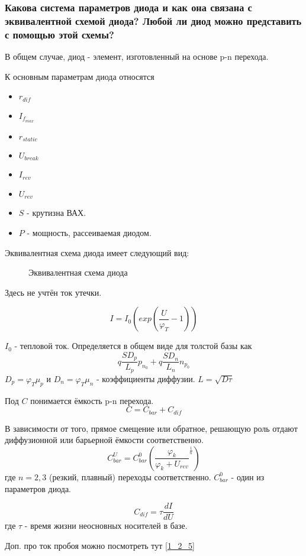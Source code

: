 \subsubsection{Какова система параметров диода и как она связана с эквивалентной схемой диода? Любой ли диод можно представить с помощью этой схемы?}

В общем случае, диод - элемент, изготовленный на основе p-n перехода.

К основным параметрам диода относятся 
\begin{itemize}
\item $r_{dif}$
\item $I_{{f}_{max}}$
\item $r_{static}$
\item $U_{break}$
\item $I_{rev}$
\item $U_{rev}$
\item $S$ - крутизна ВАХ.
\item $P$ - мощность, рассеиваемая диодом.
\end{itemize}

Эквивалентная схема диода имеет следующий вид:
\begin{center}
	\begin{figure}[h!]
		\caption{Эквивалентная схема диода}	
		\label{pic:pn-eqiv}
	\end{figure}
\end{center}
\label{diod_eq}

Здесь не учтён ток утечки.

$$
I = I_0(exp\left(\frac{U}{\varphi_T} - 1\right))
$$

$I_0$ - тепловой ток. Определяется в общем виде для толстой базы как
$$
q\frac{SD_p}{L_p}p_{n_0} + q\frac{SD_n}{L_n}n_{p_0}
$$
$D_p = \varphi_T\mu_p$ и $D_n =\varphi_T\mu_n$ - коэффициенты диффузии. $L = \sqrt{D\tau}$

Под $C$ понимается ёмкость p-n перехода.
$$
C = C_{bar} + C_{dif}
$$

В зависимости от того, прямое смещение или обратное, решающую роль отдают диффузионной или барьерной ёмкости соответственно.
$$
C_{bar}^U = C_{bar}^0\left(\frac{\varphi_k}{\varphi_k + U_{rev}}^{\frac{1}{n}}\right)
$$
где $n = 2,3$ (резкий, плавный) переходы соответственно.
$C_{bar}^0$ - один из параметров диода.

$$
C_{dif} = \tau\frac{dI}{dU}
$$
где $\tau$ - время жизни неосновных носителей в базе.

Доп. про ток пробоя можно посмотреть тут \ref{1_2_5}

\pagebreak
